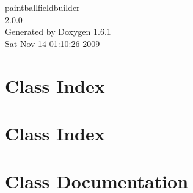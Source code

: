 \documentclass[a4paper]{book}
\begin{document}
\hypersetup{pageanchor=false}
\begin{titlepage}
\vspace*{7cm}
\begin{center}
{\Large paintballfieldbuilder \\[1ex]\large 2.0.0 }\\
\vspace*{1cm}
{\large Generated by Doxygen 1.6.1}\\
\vspace*{0.5cm}
{\small Sat Nov 14 01:10:26 2009}\\
\end{center}
\end{titlepage}
\clearemptydoublepage
{}
\tableofcontents
\clearemptydoublepage
{}
\hypersetup{pageanchor=true}
\chapter{Class Index}

\chapter{Class Index}

\chapter{Class Documentation}




















\printindex
\end{document}
